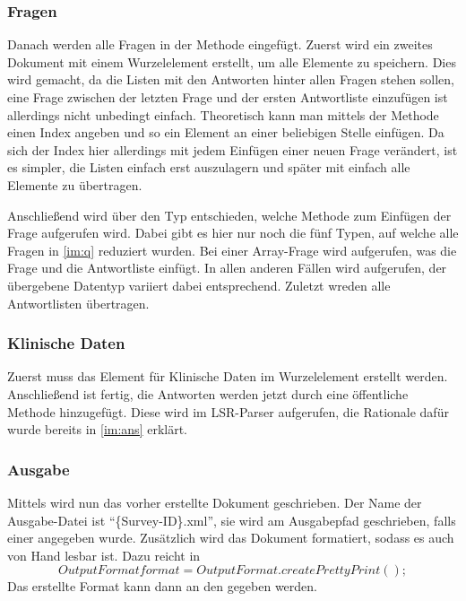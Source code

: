 \subsubsection{Fragen}

Danach werden alle Fragen in der Methode  eingefügt.
Zuerst wird ein zweites Dokument mit einem Wurzelelement erstellt, um alle  Elemente zu speichern.
Dies wird gemacht, da die Listen mit den Antworten hinter allen Fragen stehen sollen, eine Frage zwischen der letzten Frage und der ersten Antwortliste einzufügen ist allerdings nicht unbedingt einfach.
Theoretisch kann man mittels der Methode  einen Index angeben und so ein Element an einer beliebigen Stelle einfügen.
Da sich der Index hier allerdings mit jedem Einfügen einer neuen Frage verändert, ist es simpler, die Listen einfach erst auszulagern und später mit  einfach alle Elemente zu übertragen.

Anschließend wird über den Typ entschieden, welche Methode zum Einfügen der Frage aufgerufen wird. Dabei gibt es hier nur noch die fünf Typen, auf welche alle Fragen in \cref{im:q} reduziert wurden.
Bei einer Array-Frage wird  aufgerufen, was die Frage und die Antwortliste einfügt.
In allen anderen Fällen wird  aufgerufen, der übergebene Datentyp variiert dabei entsprechend.
Zuletzt wreden alle Antwortlisten übertragen.

\subsubsection{Klinische Daten}

Zuerst muss das Element für Klinische Daten im Wurzelelement erstellt werden.
Anschließend ist  fertig, die Antworten werden jetzt durch eine öffentliche Methode hinzugefügt.
Diese wird im LSR-Parser aufgerufen, die Rationale dafür wurde bereits in \cref{im:ans} erklärt.

\subsubsection{Ausgabe}

Mittels  wird nun das vorher erstellte Dokument geschrieben.
Der Name der Ausgabe-Datei ist \enquote{\{Survey-ID\}.xml}, sie wird am Ausgabepfad geschrieben, falls einer angegeben wurde.
Zusätzlich wird das Dokument formatiert, sodass es auch von Hand lesbar ist. Dazu reicht in 
\[OutputFormat format = OutputFormat.createPrettyPrint();\]
Das erstellte Format kann dann an den  gegeben werden.

